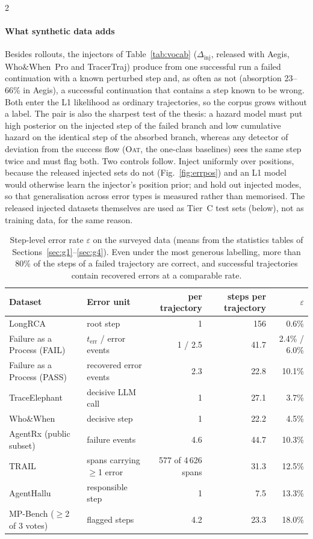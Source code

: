 \begin{multicols}{2}
\paragraph{What synthetic data adds} Besides rollouts, the injectors of Table~\ref{tab:vocab} ($\Delta_{\mathrm{inj}}$, released with Aegis, Who\&When~Pro and TracerTraj) produce from one successful run a failed continuation with a known perturbed step and, as often as not (absorption 23--66\% in Aegis), a successful continuation that contains a step known to be wrong. Both enter the L1 likelihood as ordinary trajectories, so the corpus grows without a label. The pair is also the sharpest test of the thesis: a hazard model must put high posterior on the injected step of the failed branch and low cumulative hazard on the identical step of the absorbed branch, whereas any detector of deviation from the success flow (\textsc{Oat}, the one-class baselines) sees the same step twice and must flag both. Two controls follow. Inject uniformly over positions, because the released injected sets do not (Fig.~\ref{fig:errpos}) and an L1 model would otherwise learn the injector's position prior; and hold out injected modes, so that generalisation across error types is measured rather than memorised. The released injected datasets themselves are used as Tier~C test sets (below), not as training data, for the same reason.
\end{multicols}

\begin{table}[h]\centering\small
\begin{tabular}{@{}llrrr@{}}\toprule
Dataset & Error unit & per trajectory & steps per trajectory & $\varepsilon$ \\\midrule
LongRCA & root step & 1 & 156 & 0.6\% \\
Failure as a Process (FAIL) & $t_{\mathrm{err}}$ / error events & 1 / 2.5 & 41.7 & 2.4\% / 6.0\% \\
Failure as a Process (PASS) & recovered error events & 2.3 & 22.8 & 10.1\% \\
TraceElephant & decisive LLM call & 1 & 27.1 & 3.7\% \\
Who\&When & decisive step & 1 & 22.2 & 4.5\% \\
AgentRx (public subset) & failure events & 4.6 & 44.7 & 10.3\% \\
TRAIL & spans carrying $\ge$1 error & 577 of 4\,626 spans & 31.3 & 12.5\% \\
AgentHallu & responsible step & 1 & 7.5 & 13.3\% \\
MP-Bench ($\ge$2 of 3 votes) & flagged steps & 4.2 & 23.3 & 18.0\% \\\bottomrule
\end{tabular}
\caption{Step-level error rate $\varepsilon$ on the surveyed data (means from the statistics tables of Sections~\ref{sec:g1}--\ref{sec:g4}). Even under the most generous labelling, more than 80\% of the steps of a failed trajectory are correct, and successful trajectories contain recovered errors at a comparable rate.}
\label{tab:contam}
\end{table}

